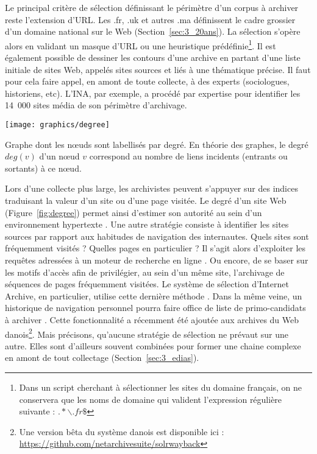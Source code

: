 \documentclass[symmetric,justified,marginals=raggedouter]{tufte-book}
\begin{document}
Le principal critère de sélection définissant le périmètre d'un corpus à archiver reste l'extension d'URL. Les .fr, .uk et autres .ma définissent le cadre grossier d'un domaine national sur le Web (Section~\ref{sec:3_20ans}). La sélection s'opère alors en validant un masque d'URL ou une heuristique prédéfinie\footnote{\RaggedOuter Dans un script cherchant à sélectionner les sites du domaine français, on ne conservera que les noms de domaine qui valident l'expression régulière suivante : $.*\backslash.fr\$$}. Il est également possible de dessiner les contours d'une archive en partant d'une liste initiale de sites Web, appelés sites sources et liés à une thématique précise. Il faut pour cela faire appel, en amont de toute collecte, à des experts (sociologues, historiens, etc). L'INA, par exemple, a procédé par expertise pour identifier les 14~000 sites média de son périmètre d'archivage. 

\begin{marginfigure}%
  \texttt{[image: graphics/degree]}
  \caption{Graphe dont les nœuds sont labellisés par degré. En théorie des graphes, le degré $deg(v)$ d'un nœud $v$ correspond au nombre de liens incidents (entrants ou sortants) à ce nœud.}
  \label{fig:degree}
\end{marginfigure} 

Lors d'une collecte plus large, les archivistes peuvent s'appuyer sur des indices traduisant la valeur d'un site ou d'une page visitée. Le degré d'un site Web (Figure~\ref{fig:degree}) permet ainsi d'estimer son autorité au sein d'un environnement hypertexte \citep{abiteboul_first_2002}. Une autre stratégie consiste à identifier les sites sources par rapport aux habitudes de navigation des internautes. Quels sites sont fréquemment visités ? Quelles pages en particulier ? Il s'agit alors d'exploiter les requêtes adressées à un moteur de recherche en ligne \citep{pandey_user-centric_2005}. Ou encore, de se baser sur les motifs d'accès \citep{alnoamany_access_2013} afin de privilégier, au sein d'un même site, l'archivage de séquences de pages fréquemment visitées. Le système de sélection d'Internet Archive, en particulier, utilise cette dernière méthode \citep{kimpton_year-by-year:_2006}. Dans la même veine, un historique de navigation personnel pourra faire office de liste de primo-candidats à archiver \citep{dumais_stuff_2016}. Cette fonctionnalité a récemment été ajoutée aux archives du Web danois\footnote{\RaggedOuter Une version bêta du système danois est disponible ici : \url{https://github.com/netarchivesuite/solrwayback}}. Mais précisons, qu'aucune stratégie de sélection ne prévaut sur une autre. Elles sont d'ailleurs souvent combinées pour former une chaine complexe en amont de tout collectage (Section~\ref{sec:3_edias}). 
\end{document}
